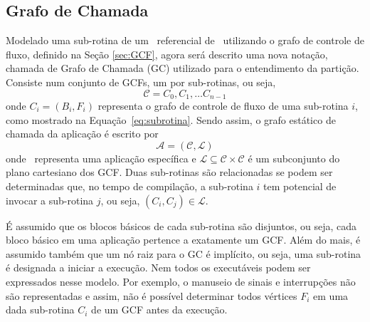       \subsection{Grafo de Chamada} \label{sec:gc}
         Modelado uma sub-rotina de um \design\ referencial de \software\ utilizando o grafo de controle de fluxo, definido na Seção \ref{sec:GCF}, agora será descrito uma nova notação, chamada de Grafo de Chamada (GC) utilizado para o entendimento da partição.
         Consiste num conjunto de GCFs, um por sub-rotinas, ou seja,
         \begin{equation}
            \mathcal{C} = {C_0, C_1, \dots C_{n-1}}
         \end{equation}
         onde $ C_i = (B_i, F_i) $ representa o grafo de controle de fluxo de uma sub-rotina $ i $, como mostrado na Equação~\ref{eq:subrotina}.
         Sendo assim, o grafo estático de chamada da aplicação é escrito por
         \begin{equation}
            \mathcal{A} = (\mathcal{C}, \mathcal{L}) \label{eq:a}
         \end{equation}
         onde \A\ representa uma aplicação específica e $ \mathcal{L} \subseteq \mathcal{C} \times \mathcal{C} $ é um subconjunto do plano cartesiano dos GCF.
         Duas sub-rotinas são relacionadas se podem ser determinadas que, no tempo de compilação, a sub-rotina $ i $ tem potencial de invocar a sub-rotina $ j $, ou seja, $ (C_i, C_j) \in \mathcal{L} $.

         É assumido que os blocos básicos de cada sub-rotina são disjuntos, ou seja, cada bloco básico em uma aplicação pertence a exatamente um GCF.
         Além do mais, é assumido também que um nó raiz para o GC é implícito, ou seja, uma sub-rotina é designada a iniciar a execução.
         Nem todos os executáveis podem ser expressados nesse modelo.
         Por exemplo, o manuseio de sinais e interrupções não são representadas e assim, não é possível determinar todos vértices $ F_i $ em uma dada sub-rotina $ C_i $ de um GCF antes da execução.

